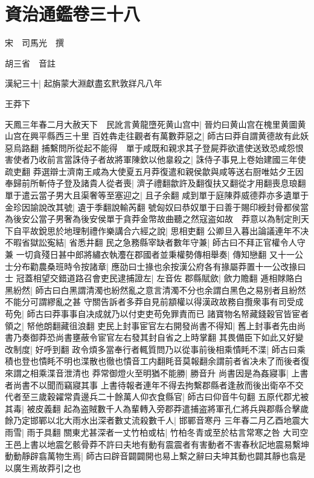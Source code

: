 \chapter{資治通鑑卷三十八}
宋　司馬光　撰

胡三省　音註

漢紀三十|{
	起旃蒙大淵獻盡玄黓敦牂凡八年}


王莽下

天鳳三年春二月大赦天下　民訛言黄龍墮死黄山宫中|{
	晉灼曰黄山宫在槐里黄圖黄山宫在興平縣西三十里}
百姓犇走往觀者有萬數莽惡之|{
	師古曰莽自謂黄德故有此妖惡烏路翻}
捕繫問所從起不能得　單于咸既和親求其子登屍莽欲遣使送致恐咸怨恨害使者乃收前言當誅侍子者故將軍陳欽以他辠殺之|{
	誅侍子事見上卷始建國三年使疏吏翻}
莽選辯士濟南王咸為大使夏五月莽復遣和親侯歙與咸等送右厨唯姑夕王因奉歸前所斬侍子登及諸貴人從者喪|{
	濟子禮翻歙許及翻復扶又翻從才用翻喪息琅翻}
單于遣云當子男大且渠奢等至塞迎之|{
	且子余翻}
咸到單于庭陳莽威德莽亦多遺單于金珍因諭說改其號|{
	遺于季翻說輸芮翻}
號匈奴曰恭奴單于曰善于賜印綬封骨都侯當為後安公當子男奢為後安侯單于貪莽金幣故曲聽之然寇盗如故　莽意以為制定則天下自平故銳思於地理制禮作樂講合六經之說|{
	思相吏翻}
公卿旦入暮出論議連年不决不暇省獄訟寃結|{
	省悉井翻}
民之急務縣宰缺者數年守兼|{
	師古曰不拜正官權令人守兼}
一切貪殘日甚中郎將繡衣執灋在郡國者並秉權勢傳相舉奏|{
	傳知戀翻}
又十一公士分布勸農桑班時令按諸章|{
	應劭曰士掾也余按漢公府各有掾屬莽置十一公改掾曰士}
冠蓋相望交錯道路召會吏民逮捕證左|{
	左音佐}
郡縣賦歛|{
	歛力贍翻}
逓相賕賂白黑紛然|{
	師古曰白黑謂清濁也紛然亂之意言清濁不分也余謂白黑色之易别者且紛然不能分可謂繆亂之甚}
守關告訴者多莽自見前顓權以得漢政故務自攬衆事有司受成苟免|{
	師古曰莽事事自决成就乃以付吏吏苟免罪責而已}
諸寶物名帑藏錢穀官皆宦者領之|{
	帑他朗翻藏徂浪翻}
吏民上封事宦官左右開發尚書不得知|{
	舊上封事者先由尚書乃奏御莽恐尚書壅蔽令宦官左右發其封自省之上時掌翻}
其畏備臣下如此又好變改制度|{
	好呼到翻}
政令煩多當奉行者輒質問乃以從事前後相乘憒眊不渫|{
	師古曰乘積也登也憒眊不明也渫散也徹也憒音工内翻眊音莫報翻余謂前者省决未了而後者復來謂之相乘渫音泄清也}
莽常御燈火至明猶不能勝|{
	勝音升}
尚書因是為姦寢事|{
	上書者尚書不以聞而竊寢其事}
上書待報者連年不得去拘繫郡縣者逢赦而後出衛卒不交代者至三歲穀糴常貴邊兵二十餘萬人仰衣食縣官|{
	師古曰仰音牛句翻}
五原代郡尤被其毒|{
	被皮義翻}
起為盗賊數千人為輩轉入旁郡莽遣捕盗將軍孔仁將兵與郡縣合擊歲餘乃定邯鄲以北大雨水出深者數丈流殺數千人|{
	邯鄲音寒丹}
三年春二月乙酉地震大雨雪|{
	雨于具翻}
關東尤甚深者一丈竹柏或枯|{
	竹柏冬青或至於枯言常寒之咎}
大司空王邑上書以地震乞骸骨莽不許曰夫地有動有震震者有害動者不害春秋記地震易繫坤動動靜辟翕萬物生焉|{
	師古曰辟音闢闢開也易上繫之辭曰夫坤其動也闢其靜也翕是以廣生焉故莽引之也}
